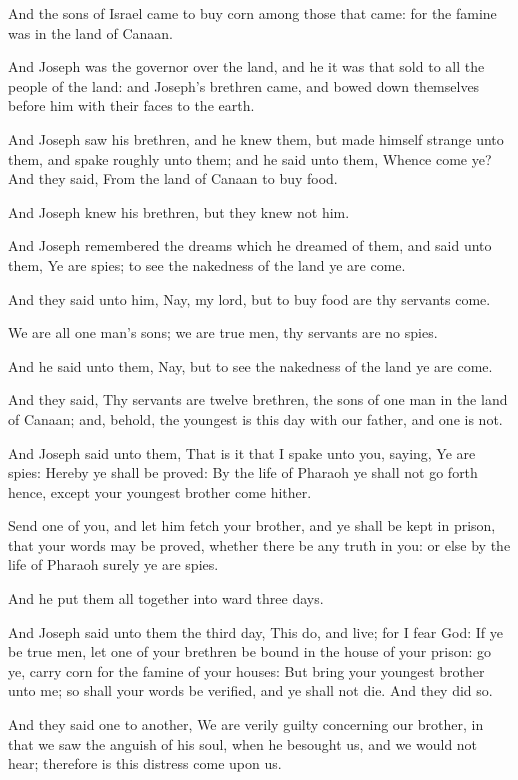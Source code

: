 \verse And the sons of Israel came to buy corn among those that came:
for the famine was in the land of Canaan.

\verse And Joseph was the governor over the land, and he it was that
sold to all the people of the land: and Joseph's brethren came, and
bowed down themselves before him with their faces to the earth.

\verse And Joseph saw his brethren, and he knew them, but made himself
strange unto them, and spake roughly unto them; and he said unto them,
Whence come ye? And they said, From the land of Canaan to buy food.

\verse And Joseph knew his brethren, but they knew not him.

\verse And Joseph remembered the dreams which he dreamed of them, and
said unto them, Ye are spies; to see the nakedness of the land ye are
come.

\verse And they said unto him, Nay, my lord, but to buy food are thy
servants come.

\verse We are all one man's sons; we are true men, thy servants are no
spies.

\verse And he said unto them, Nay, but to see the nakedness of the land
ye are come.

\verse And they said, Thy servants are twelve brethren, the sons of one
man in the land of Canaan; and, behold, the youngest is this day with
our father, and one is not.

\verse And Joseph said unto them, That is it that I spake unto you,
saying, Ye are spies: \verse Hereby ye shall be proved: By the life of
Pharaoh ye shall not go forth hence, except your youngest brother come
hither.

\verse Send one of you, and let him fetch your brother, and ye shall be
kept in prison, that your words may be proved, whether there be any
truth in you: or else by the life of Pharaoh surely ye are spies.

\verse And he put them all together into ward three days.

\verse And Joseph said unto them the third day, This do, and live; for
I fear God: \verse If ye be true men, let one of your brethren be bound
in the house of your prison: go ye, carry corn for the famine of your
houses: \verse But bring your youngest brother unto me; so shall your
words be verified, and ye shall not die. And they did so.

\verse And they said one to another, We are verily guilty concerning
our brother, in that we saw the anguish of his soul, when he besought
us, and we would not hear; therefore is this distress come upon us.

